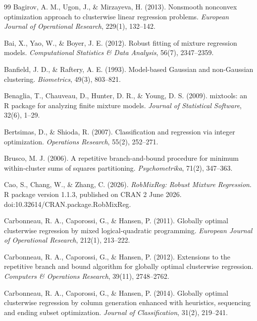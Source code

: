 \begin{thebibliography}{99}
\small
{} Bagirov, A. M., Ugon, J., \& Mirzayeva, H. (2013). Nonsmooth nonconvex optimization approach to clusterwise linear regression problems. \textit{European Journal of Operational Research}, 229(1), 132--142.

 Bai, X., Yao, W., \& Boyer, J. E. (2012). Robust fitting of mixture regression models. \textit{Computational Statistics \& Data Analysis}, 56(7), 2347--2359.

 Banfield, J. D., \& Raftery, A. E. (1993). Model-based Gaussian and non-Gaussian clustering. \textit{Biometrics}, 49(3), 803--821.

 Benaglia, T., Chauveau, D., Hunter, D. R., \& Young, D. S. (2009). mixtools: an R package for analyzing finite mixture models. \textit{Journal of Statistical Software}, 32(6), 1--29.

 Bertsimas, D., \& Shioda, R. (2007). Classification and regression via integer optimization. \textit{Operations Research}, 55(2), 252--271.

 Brusco, M. J. (2006). A repetitive branch-and-bound procedure for minimum within-cluster sums of squares partitioning. \textit{Psychometrika}, 71(2), 347--363.

 Cao, S., Chang, W., \& Zhang, C. (2026). \textit{RobMixReg: Robust Mixture Regression}. R package version 1.1.3, published on CRAN 2 June 2026. doi:10.32614/CRAN.package.RobMixReg.

 Carbonneau, R. A., Caporossi, G., \&
Hansen, P. (2011). Globally optimal clusterwise regression by mixed logical-quadratic
programming. \textit{European Journal of Operational Research}, 212(1), 213--222.

 Carbonneau, R. A., Caporossi, G.,
\& Hansen, P. (2012). Extensions to the repetitive branch and bound algorithm for globally
optimal clusterwise regression. \textit{Computers \& Operations Research}, 39(11),
2748--2762.

 Carbonneau, R. A., Caporossi, G., \& Hansen, P. (2014). Globally optimal clusterwise regression by column generation enhanced with heuristics, sequencing and ending subset optimization. \textit{Journal of Classification}, 31(2), 219--241.


\end{thebibliography}
